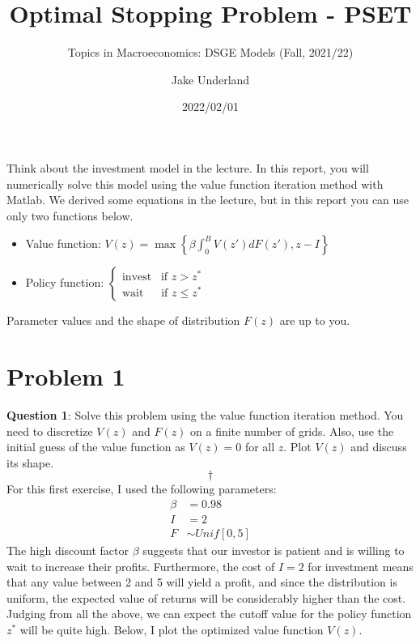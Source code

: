 \documentclass[
]{article}
\title{Optimal Stopping Problem - PSET}
\subtitle{Topics in Macroeconomics: DSGE Models (Fall, 2021/22)}
\author{Jake Underland}
\date{2022/02/01}
\begin{document}
\maketitle

{
\setcounter{tocdepth}{2}
\tableofcontents
}
Think about the investment model in the lecture. In this report, you
will numerically solve this model using the value function iteration
method with Matlab. We derived some equations in the lecture, but in
this report you can use only two functions below.\\

\begin{itemize} 
\item Value function: $V(z)=\max\left\{ \beta \int_0^B V(z')dF(z'), z - I \right\}$
\item Policy function: $\begin{cases} \text{invest} \;\;\; \text{if } z > z^* \\\text{wait} \;\;\:\:\: \text{ if } z \le z^*\end{cases}$
\end{itemize}

Parameter values and the shape of distribution \(F(z)\) are up to you.

\hypertarget{problem-1}{%
\section{Problem 1}\label{problem-1}}

\textbf{Question 1}: Solve this problem using the value function
iteration method. You need to discretize \(V(z)\) and \(F(z)\) on a
finite number of grids. Also, use the initial guess of the value
function as \(V (z) = 0\) for all \(z\). Plot \(V (z)\) and discuss its
shape. \[\dagger\] For this first exercise, I used the following
parameters: \[
\begin{aligned}
\beta &= 0.98 \\
I &= 2 \\
F &\sim Unif\left[0, 5\right]
\end{aligned}
\] The high discount factor \(\beta\) suggests that our investor is
patient and is willing to wait to increase their profits. Furthermore,
the cost of \(I = 2\) for investment means that any value between 2 and
5 will yield a profit, and since the distribution is uniform, the
expected value of returns will be considerably higher than the cost.
Judging from all the above, we can expect the cutoff value for the
policy function \(z^*\) will be quite high. Below, I plot the optimized
value function \(V(z)\).
\end{document}
